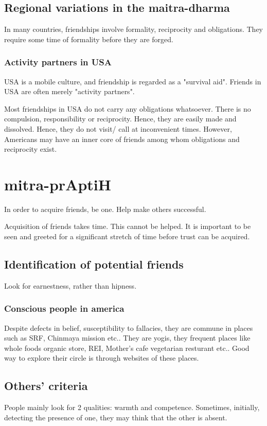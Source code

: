 \documentclass[oneside, article]{memoir}
\begin{document}
\subsection{Regional variations in the maitra-dharma}
In many countries, friendships involve formality, reciprocity and obligations. They require some time of formality before they are forged.

\subsubsection{Activity partners in USA}
\subitem USA is a mobile culture, and friendship is regarded as a "survival aid". Friends in USA are often merely "activity partners".

\subitem Most friendships in USA do not carry any obligations whatsoever. There is no compulsion, responsibility or reciprocity. Hence, they are easily made and dissolved. Hence, they do not visit/ call at inconvenient times. However, Americans may have an inner core of friends among whom obligations and reciprocity exist.

\section{mitra-prAptiH}
In order to acquire friends, be one. Help make others successful.

Acquisition of friends takes time. This cannot be helped. It is important to be seen and greeted for a significant stretch of time before trust can be acquired.


\subsection{Identification of potential friends}
\subitem Look for earnestness, rather than hipness.

\subsubsection{Conscious people in america}
Despite defects in belief, susceptibility to fallacies, they are commune in places such as SRF, Chinmaya mission etc.. They are yogis, they frequent places like whole foods organic store, REI, Mother's cafe vegetarian resturant etc.. Good way to explore their circle is through websites of these places.


\subsection{Others' criteria}
People mainly look for 2 qualities: warmth and competence. Sometimes, initially, detecting the presence of one, they may think that the other is absent.
\end{document}
